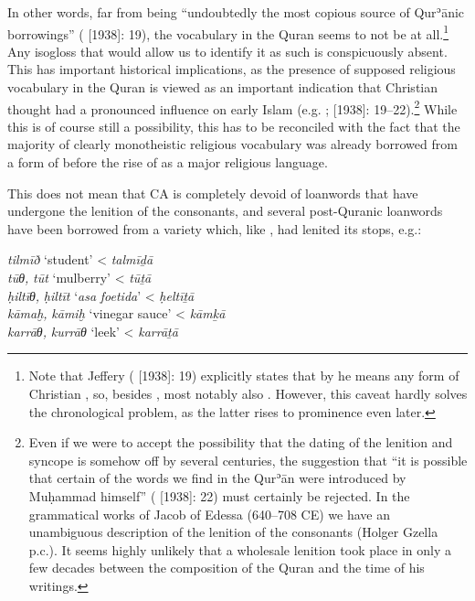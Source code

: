 \documentclass[output=paper]{langsci/langscibook}
\begin{document}
In other words, far from  being “undoubtedly the most copious source of Qurʾānic borrowings” (\citealt{Jeffrey2007} [1938]: 19), the  vocabulary in the {Quran} seems to not be  at all.\footnote{Note that Jeffery (\citeyear{Jeffrey2007} [1938]: 19) explicitly states that by  he means any form of Christian , so, besides , most notably also . However, this caveat hardly solves the chronological problem, as the latter rises to prominence even later.} Any isogloss that would allow us to identify it as such is conspicuously absent. This has important historical implications, as the presence of supposed  religious vocabulary in the {Quran} is viewed as an important indication that  Christian thought had a pronounced influence on early Islam (e.g. \citealt[82--90]{Mingana1927}; \citealt{Jeffrey2007} [1938]: 19--22).\footnote{Even if we were to accept the possibility that the dating of the lenition and syncope is somehow off by several centuries, the suggestion that “it is possible that certain of the  words we find in the Qurʾān were introduced by Muḥammad himself” (\citealt{Jeffrey2007} [1938]: 22) must certainly be rejected. In the grammatical works of Jacob of Edessa (640–708 CE) we have an unambiguous description of the lenition of the consonants (Holger Gzella p.c.). It seems highly unlikely that a wholesale lenition took place in only a few decades between the composition of the {Quran} and the time of his writings.} While this is of course still a possibility, this has to be reconciled with the fact that the majority of clearly monotheistic religious vocabulary was already borrowed from a form of  before the rise of  as a major religious language.

This does not mean that CA is completely devoid of  {loanwords} that have undergone the lenition of the consonants, and several post-Quranic {loanwords} have been borrowed from a variety which, like , had lenited its stops, e.g.:

\ea
\ea\textit{tilmīð} ‘student’ <  \textit{talmīḏā}  \citep[254]{Fraenkel1886}\\
\ex\textit{tūθ,} \textit{tūt} ‘mulberry’ <  \textit{tūṯā}  \citep[140]{Fraenkel1886}\\
\ex\textit{ḥiltīθ,} \textit{ḥiltīt} ‘\textit{asa} \textit{foetida}’ <  \textit{ḥeltīṯā} \citep[140]{Fraenkel1886}\\
\ex\textit{kāmaḫ,} \textit{kāmiḫ} ‘vinegar sauce’ <  \textit{kāmḵā} \citep[288]{Fraenkel1886}\\
\ex\textit{karrāθ,} \textit{kurrāθ} ‘leek’ <  \textit{karrāṯā} \citep[144]{Fraenkel1886}
\z
\z
\end{document}
